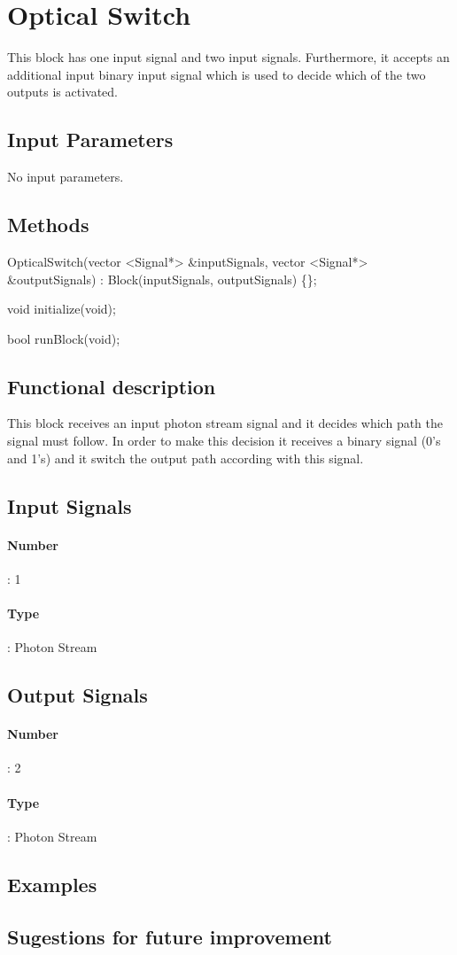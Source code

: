 \clearpage

\section{Optical Switch}

\maketitle
This block has one input signal and two input signals. Furthermore, it accepts an additional input binary input signal which is used to decide which of the two outputs is activated. 


\subsection*{Input Parameters}
    No input parameters.

\subsection*{Methods}

OpticalSwitch(vector <Signal*> \&inputSignals, vector <Signal*> \&outputSignals) : Block(inputSignals, outputSignals) \{\};

void initialize(void);

bool runBlock(void);


\subsection*{Functional description}
This block receives an input photon stream signal and it decides which path the signal must follow. In order to make this decision it receives a binary signal (0's and 1's) and it switch the output path according with this signal.

\subsection*{Input Signals}
\paragraph*{Number}: 1
\paragraph*{Type}: Photon Stream

\subsection*{Output Signals}
\paragraph*{Number}: 2
\paragraph*{Type}: Photon Stream

\subsection*{Examples}


\subsection*{Sugestions for future improvement} 